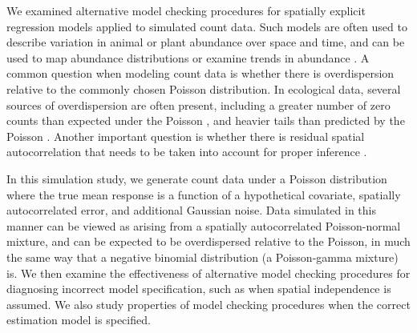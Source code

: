 \documentclass[12pt,english]{article}
\begin{document}
\begin{spacing}{1.9}
We examined alternative model checking procedures for spatially
explicit regression models applied to simulated count data.  Such
models are often used to describe variation in animal or plant
abundance over space and time, and can be used to map abundance
distributions or examine trends in abundance
\citep[e.g.,][]{SauerLink2011,ConnEtAl2014}.  A common question when
modeling count data is whether there is overdispersion relative to the
commonly chosen Poisson distribution.  In ecological data, several
sources of overdispersion are often present, including a greater
number of zero counts than expected under the Poisson \citep[zero
inflation;][]{AgarwalEtAl2002}, and heavier tails than predicted by
the Poisson \citep{PottsElith2006,VerHoefBoveng2007}.  Another
important question is whether there is residual spatial
autocorrelation that needs to be taken into account for proper
inference \citep{Legendre1993,LichsteinEtAl2002}.

In this simulation study, we generate count data under a Poisson
distribution where the true mean response is a function of a
hypothetical covariate, spatially autocorrelated error, and additional
Gaussian noise.  Data simulated in this manner can be viewed as
arising from a spatially autocorrelated Poisson-normal mixture, and
can be expected to be overdispersed relative to the Poisson, in much
the same way that a negative binomial distribution (a Poisson-gamma
mixture) is.  We then examine the effectiveness of alternative model
checking procedures for diagnosing incorrect model specification, such
as when spatial independence is assumed.  We also study properties of
model checking procedures when the correct estimation model is
specified.


\end{spacing}
\end{document}
